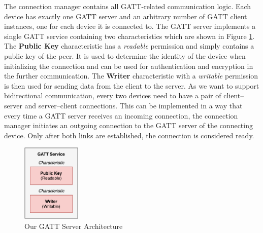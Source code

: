 The connection manager contains all GATT-related communication logic. Each device has exactly one GATT server and an arbitrary number of GATT client instances, one for each device it is connected to. The GATT server implements a single GATT service containing two characteristics which are shown in Figure \ref{gatt_server}. The \textbf{Public Key} characteristic has a \textit{readable} permission and simply contains a public key of the peer. It is used to determine the identity of the device when initializing the connection and can be used for authentication and encryption in the further communication. The \textbf{Writer} characteristic with a \textit{writable} permission is then used for sending data from the client to the server. As we want to support bidirectional communication, every two devices need to have a pair of client–server and server–client connections. This can be implemented in a way that every time a GATT server receives an incoming connection, the connection manager initiates an outgoing connection to the GATT server of the connecting device. Only after both links are established, the connection is considered ready.

\begin{figure}
    \centering
    \includegraphics[width=0.25\textwidth]{diagrams/ipv8-gatt}
    \caption{Our GATT Server Architecture}
    \label{gatt_server}
\end{figure}




